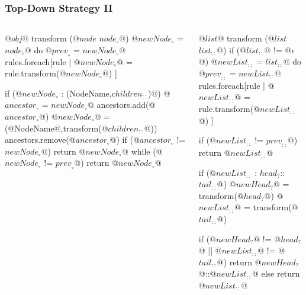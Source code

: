 \documentclass{beamer}
\newcommand{\id}[1]{\ensuremath{#1}}
\newcommand{\type}[1]{\id{#1}}
\newcommand{\obj} [1]{\ensuremath{{\id{#1}}_?}}
\newcommand{\node}[1]{\ensuremath{{\id{#1}}_\circ}}
\newcommand{\name}[1]{\textsf{#1}}
\newcommand{\lst} [1]{\ensuremath{{\id{#1}}_{::}}}
\begin{document}
\begin{frame}[fragile]
\frametitle{Top-Down Strategy II}

\begin{columns}
	
	
	\begin{PseudoCode}
@\type{obj}@ transform (@\type{node} \node{node}@)
  @\node{newNode} = \node{node}@
  do @\node{prev} = \node{newNode}@
    rules.foreach[rule |
      @\node{newNode}@ = rule.transform(@\node{newNode}@)
    ]
    
    if (@\node{newNode} : (\name{NodeName},\lst{children})@)
      @\node{ancestor} = \node{newNode}@
      ancestors.add(@\node{ancestor}@)
      @\node{newNode}@ = (@\name{NodeName}@,transform(@\lst{children}@))
      ancestors.remove(@\node{ancestor}@)
      if (@\node{ancestor} != \node{newNode}@)
        return @\node{newNode}@
  while (@\node{newNode} != \node{prev}@)
  return @\node{newNode}@
	\end{PseudoCode}
	
	
	\begin{PseudoCode}
@\type{list}@ transform (@\type{list} \lst{list}@)
  if (@\lst{list}@ != @$\epsilon$@)
    @\lst{newList} = \lst{list}@
    do @\lst{prev} = \lst{newList}@
      rules.foreach[rule |
        @\lst{newList}@ = rule.transform(@\lst{newList}@)
      ]

    if (@\lst{newList} != \lst{prev}@)
      return @\lst{newList}@
      
    if (@\lst{newList} : \obj{head}::\lst{tail}@)
      @\obj{newHead}@ = transform(@\obj{head}@)
      @\lst{newList}@ = transform(@\lst{tail}@)
      
      if (@\obj{newHead}@ != @\obj{head}@ || @\lst{newList}@ != @\lst{tail}@)
        return @\obj{newHead}@::@\lst{newList}@
      else
        return @\lst{newList}@
\end{PseudoCode}
	
\end{columns}

\end{frame}
\end{document}
